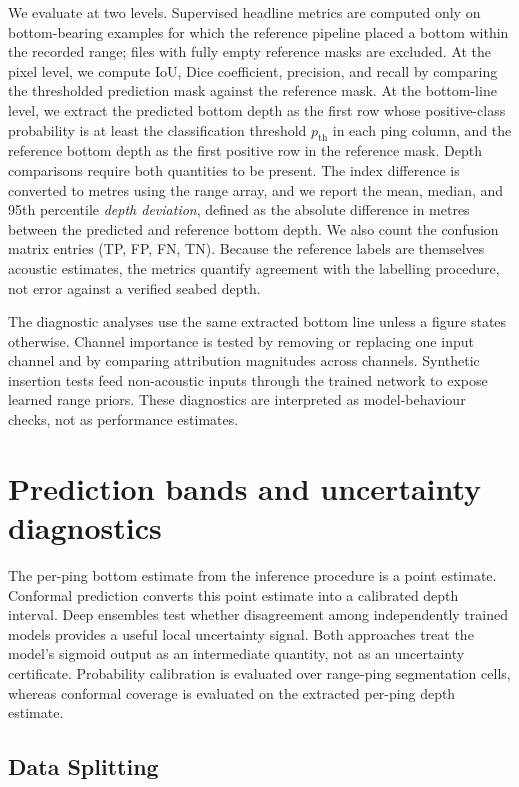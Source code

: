 We evaluate at two levels. Supervised headline metrics are computed only on bottom-bearing examples for which the reference pipeline placed a bottom within the recorded range; files with fully empty reference masks are excluded. At the pixel level, we compute IoU, Dice coefficient, precision, and recall by comparing the thresholded prediction mask against the reference mask. At the bottom-line level, we extract the predicted bottom depth as the first row whose positive-class probability is at least the classification threshold $p_{\mathrm{th}}$ in each ping column, and the reference bottom depth as the first positive row in the reference mask. Depth comparisons require both quantities to be present. The index difference is converted to metres using the range array, and we report the mean, median, and 95th percentile \emph{depth deviation}, defined as the absolute difference in metres between the predicted and reference bottom depth. We also count the confusion matrix entries (TP, FP, FN, TN). Because the reference labels are themselves acoustic estimates, the metrics quantify agreement with the labelling procedure, not error against a verified seabed depth.

The diagnostic analyses use the same extracted bottom line unless a figure states otherwise. Channel importance is tested by removing or replacing one input channel and by comparing attribution magnitudes across channels. Synthetic insertion tests feed non-acoustic inputs through the trained network to expose learned range priors. These diagnostics are interpreted as model-behaviour checks, not as performance estimates.


\section{Prediction bands and uncertainty diagnostics}
\label{sec:uq-validation}

The per-ping bottom estimate from the inference procedure is a point estimate. Conformal prediction converts this point estimate into a calibrated depth interval. Deep ensembles test whether disagreement among independently trained models provides a useful local uncertainty signal. Both approaches treat the model's sigmoid output as an intermediate quantity, not as an uncertainty certificate. Probability calibration is evaluated over range-ping segmentation cells, whereas conformal coverage is evaluated on the extracted per-ping depth estimate.

\subsection{Data Splitting}

